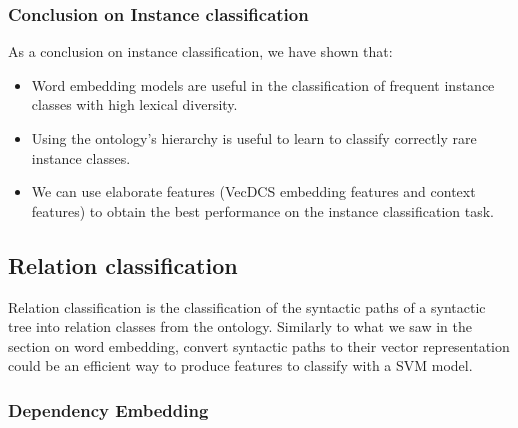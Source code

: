 \documentclass[12pt]{article}
\begin{document}
\subsubsection{Conclusion on Instance classification}

As a conclusion on instance classification, we have shown that:
\begin{itemize}
\item Word embedding models are useful in the classification of frequent instance classes with high lexical diversity.
\item Using the ontology's hierarchy is useful to learn to classify correctly rare instance classes.
\item We can use elaborate features (VecDCS embedding features and context features) to obtain the best performance on the instance classification task.
\end{itemize}

\subsection{Relation classification}

Relation classification is the classification of the syntactic paths of a syntactic tree into relation classes from the ontology. 
Similarly to what we saw in the section on word embedding, convert syntactic paths to their vector representation could be an efficient way to produce features to classify with a SVM model.

\subsubsection{Dependency Embedding}
\end{document}
